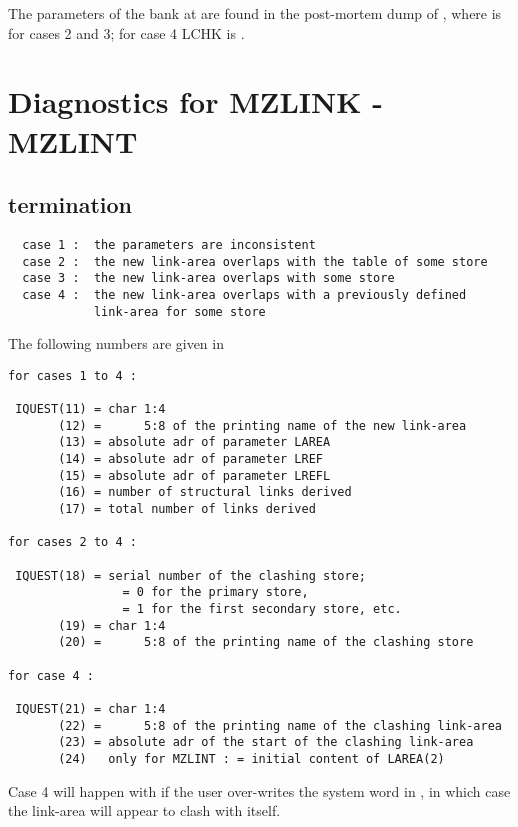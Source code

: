 The parameters of the bank at  are found in the post-mortem
dump of , where  is  for cases 2 and 3;
for case 4 LCHK is .

\section{Diagnostics for MZLINK - MZLINT}


\subsection*{ termination}

\begin{verbatim}
  case 1 :  the parameters are inconsistent
  case 2 :  the new link-area overlaps with the table of some store
  case 3 :  the new link-area overlaps with some store
  case 4 :  the new link-area overlaps with a previously defined
            link-area for some store
\end{verbatim}

The following numbers are given in 

\begin{verbatim}
for cases 1 to 4 :

 IQUEST(11) = char 1:4
       (12) =      5:8 of the printing name of the new link-area
       (13) = absolute adr of parameter LAREA
       (14) = absolute adr of parameter LREF
       (15) = absolute adr of parameter LREFL
       (16) = number of structural links derived
       (17) = total number of links derived

for cases 2 to 4 :

 IQUEST(18) = serial number of the clashing store;
                = 0 for the primary store,
                = 1 for the first secondary store, etc.
       (19) = char 1:4
       (20) =      5:8 of the printing name of the clashing store

for case 4 :

 IQUEST(21) = char 1:4
       (22) =      5:8 of the printing name of the clashing link-area
       (23) = absolute adr of the start of the clashing link-area
       (24)   only for MZLINT : = initial content of LAREA(2)
\end{verbatim}

Case 4 will happen with  if the user over-writes
the system word in ,
in which case the link-area will appear to clash with itself.

